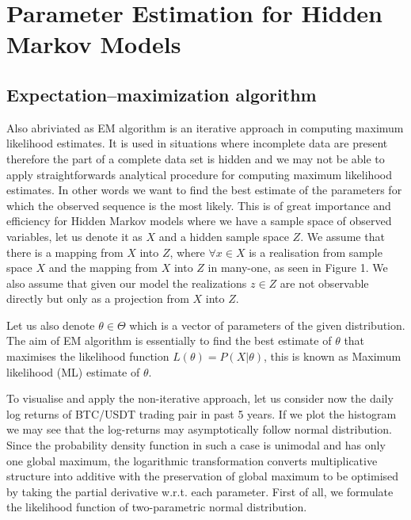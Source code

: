 
\chapter{Parameter Estimation for Hidden Markov Models}

\ifpdf
    \graphicspath{{Chapter2/Figs/Raster/}{Chapter2/Figs/PDF/}{Chapter2/Figs/}}
\else
    \graphicspath{{Chapter2/Figs/Vector/}{Chapter2/Figs/}}
\fi

\section{ Expectation–maximization algorithm}

Also abriviated as EM algorithm is an iterative approach in computing maximum likelihood estimates. It is used in situations where incomplete data are present therefore the part of a complete data set is hidden and we may not be able to apply straightforwards analytical procedure for computing maximum likelihood estimates. In other words we want to find the best estimate of the parameters for which the observed sequence is the most likely. This is of great importance and efficiency for Hidden Markov models where we have a sample space of observed variables, let us denote it as $X$ and a hidden sample space $Z$. We assume that there is a mapping from $X$ into $Z$, where $\forall x \in X$ is a realisation from sample space $X$ and the mapping from $X$ into $Z$ in many-one, as seen in Figure 1. We also assume that given our model the realizations $z \in Z$ are not observable directly but only as a projection from $X$ into $Z$. 

Let us also denote $\theta \in \Theta$ which is a vector of parameters of the given distribution. The aim of EM algorithm is essentially to find the best estimate of $\theta$ that maximises the likelihood function $L(\theta) = P(X|\theta)$, this is known as Maximum likelihood (ML) estimate of $\theta$. 

To visualise and apply the non-iterative approach, let us consider now the daily log returns of BTC/USDT trading pair in past 5 years. If we plot the histogram we may see that the log-returns may asymptotically follow normal distribution. Since the probability density function in such a case is unimodal and has only one global maximum, the logarithmic transformation converts multiplicative structure into additive with the preservation of global maximum to be optimised by taking the partial derivative w.r.t. each parameter. First of all, we formulate the likelihood function of two-parametric normal distribution.
 
